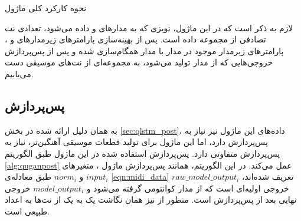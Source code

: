 \begin{algorithm}[t]
\caption{نحوه کارکرد کلی ماژول } \label{alg:qugan_iteration}
\end{algorithm}

لازم به ذکر است که در این ماژول، نویزی که به مدارهای
و
داده می‌شود، تعدادی نت تصادفی از مجموعه داده است.
پس از بهینه‌سازی پارامترهای زیرمدارهای
و
،
پارامترهای زیرمدار
موجود در مدار 
با مدار
همگام‌سازی شده و پس از پس‌پردازش خروجی‌هایی که از مدار
تولید می‌شود، به مجموعه‌ای از نت‌های موسیقی دست می‌یابیم.

\subsection{پس‌پردازش}

به همان دلیل ارائه شده در بخش
\ref{sec:qlstm_post}،
داده‌های این ماژول نیز نیاز به پس‌پردازش دارد، اما این ماژول برای تولید قطعات موسیقی آهنگین‌تر، نیاز به پس‌پردازش متفاوتی دارد.
پس‌پردازش استفاده شده در این ماژول طبق الگوریتم
\ref{alg:quganpost}
عمل می‌کند.
در این الگوریتم، همانند پس‌پردازش ماژول
،
متغیرهای
$input_i$
و
$norm_i$
طبق معادله‌ی
\ref{eqn:midi_data}
تعریف شده‌اند،
$raw\_model\_output_i$
خروجی اولیه‌ای است که از مدار کوانتومی گرفته می‌شود و
$model\_output_i$
خروجی نهایی بعد از پس‌پردازش است.
منظور از 
نیز همان نگاشت یک به یک از نت‌ها به اعداد طبیعی است.

